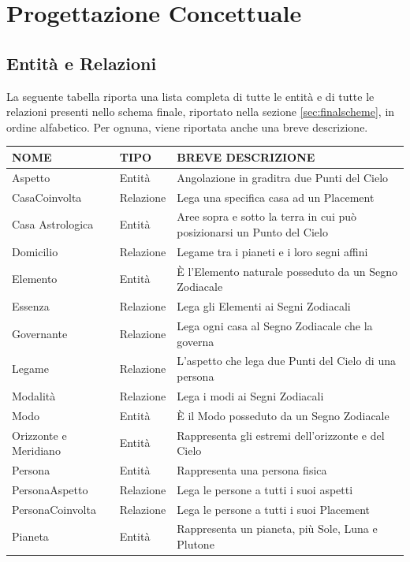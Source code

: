 \chapter{Progettazione Concettuale}
\section{Entità e Relazioni}
La seguente tabella riporta una lista completa di tutte le entità e di tutte le relazioni presenti nello schema finale, riportato nella sezione \ref{sec:finalscheme}, in ordine alfabetico.
Per ognuna, viene riportata anche una breve descrizione.\newline
{
\begin{longtable}{ |p{4cm}|p{1.8cm}|p{5.7cm}|  }
\endfoot
\hline
\textbf{NOME} & \textbf{TIPO} & \textbf{BREVE DESCRIZIONE} \\
\hline
Aspetto & Entità & Angolazione in gradi\newline tra due Punti del Cielo\\
CasaCoinvolta & Relazione & Lega una specifica casa ad un Placement \\
Casa Astrologica & Entità & Aree sopra e sotto la terra in cui può posizionarsi un Punto del Cielo \\
Domicilio & Relazione & Legame tra i pianeti e i loro segni affini \\
Elemento & Entità & È l'Elemento naturale posseduto da un Segno Zodiacale\\
Essenza & Relazione & Lega gli Elementi ai Segni Zodiacali \\
Governante & Relazione & Lega ogni casa al Segno Zodiacale che la governa\\
Legame & Relazione & L'aspetto che lega due Punti del Cielo di una persona\\
Modalità & Relazione & Lega i modi ai Segni Zodiacali \\
Modo & Entità & È il Modo posseduto da un Segno Zodiacale \\
Orizzonte e Meridiano & Entità & Rappresenta gli estremi dell'orizzonte e del Cielo \\
Persona & Entità & Rappresenta una persona fisica \\
\hline
PersonaAspetto & Relazione & Lega le persone a tutti i suoi aspetti  \\
PersonaCoinvolta & Relazione & Lega le persone a tutti i suoi Placement \\
Pianeta & Entità & Rappresenta un pianeta, più Sole, Luna e Plutone \\

\end{longtable}}
